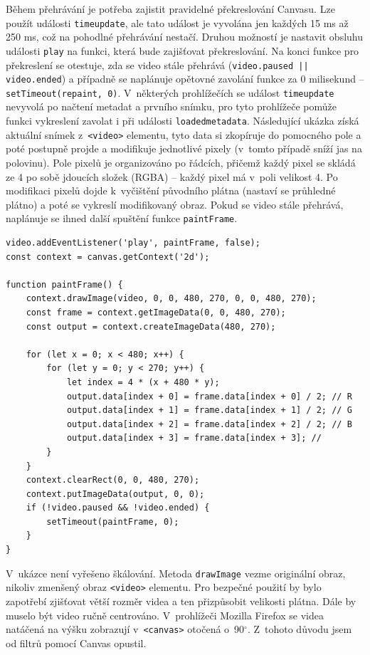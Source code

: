 Během přehrávání je potřeba zajistit pravidelné překreslování Canvasu. Lze použít události \texttt{timeupdate}, ale tato událost je vyvolána jen každých 15 ms až 250 ms, což na pohodlné přehrávání nestačí. Druhou možností je nastavit obsluhu události \texttt{play} na funkci, která bude zajišťovat překreslování. Na konci funkce pro překreslení se otestuje, zda se video stále přehrává (\texttt{video.paused || video.ended}) a případně se naplánuje opětovné zavolání funkce za 0 milisekund -- \texttt{setTimeout(repaint, 0)}. V~některých prohlížečích se událost \texttt{timeupdate} nevyvolá po načtení metadat a prvního snímku, pro tyto prohlížeče pomůže funkci vykreslení zavolat i při události \texttt{loadedmetadata}. Následující ukázka získá aktuální snímek z~\texttt{<video>} elementu, tyto data si zkopíruje do pomocného pole a poté postupně projde a modifikuje jednotlivé pixely (v~tomto případě sníží jas na polovinu). Pole pixelů je organizováno po řádcích, přičemž každý pixel se skládá ze 4 po sobě jdoucích složek (RGBA) -- každý pixel má v~poli velikost 4. Po modifikaci pixelů dojde k~vyčištění původního plátna (nastaví se průhledné plátno) a poté se vykreslí modifikovaný obraz. Pokud se video stále přehrává, naplánuje se ihned další spuštění funkce \texttt{paintFrame}.
\begin{lstlisting}[style=JavaScript]
video.addEventListener('play', paintFrame, false);
const context = canvas.getContext('2d');

function paintFrame() {
    context.drawImage(video, 0, 0, 480, 270, 0, 0, 480, 270);
    const frame = context.getImageData(0, 0, 480, 270);
    const output = context.createImageData(480, 270);
    
    for (let x = 0; x < 480; x++) {
        for (let y = 0; y < 270; y++) {
            let index = 4 * (x + 480 * y);
            output.data[index + 0] = frame.data[index + 0] / 2; // R
            output.data[index + 1] = frame.data[index + 1] / 2; // G
            output.data[index + 2] = frame.data[index + 2] / 2; // B
            output.data[index + 3] = frame.data[index + 3]; //
        }
    }
    context.clearRect(0, 0, 480, 270);
    context.putImageData(output, 0, 0);
    if (!video.paused && !video.ended) {
        setTimeout(paintFrame, 0);
    }
}
\end{lstlisting}

V~ukázce není vyřešeno škálování. Metoda \texttt{drawImage} vezme originální obraz, nikoliv zmenšený obraz \texttt{<video>} elementu. Pro bezpečné použití by bylo zapotřebí zjišťovat větší rozměr videa a ten přizpůsobit velikosti plátna. Dále by muselo být video ručně centrováno. V~prohlížeči Mozilla Firefox se videa natáčená na výšku zobrazují v~\texttt{<canvas>} otočená o~90$^{\circ}$. Z~tohoto důvodu jsem od filtrů pomocí Canvas opustil.

